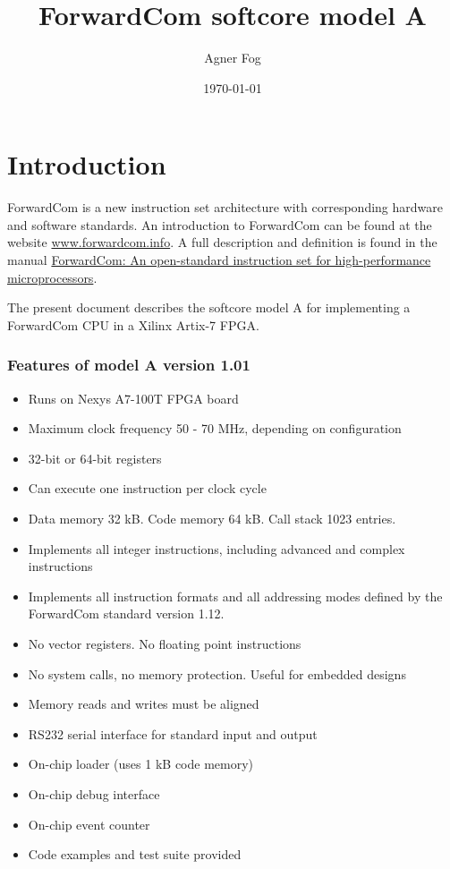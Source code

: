 \documentclass[11pt,a4paper,oneside,openright]{report}
\newcommand{\vv}{ \vspace{2mm} }   %
\begin{document}
\title{ForwardCom softcore model A}
\author{Agner Fog}
\date{\today}
\maketitle
\RaggedRight

\tableofcontents
\setcounter{secnumdepth}{1}


\chapter{Introduction}
ForwardCom is a new instruction set architecture with corresponding hardware and software standards. An introduction to ForwardCom can be found at the website \href{https://www.forwardcom.info}{www.forwardcom.info}. 
A full description and definition is found in the manual 
\href{https://github.com/ForwardCom/manual/raw/master/forwardcom.pdf}{ForwardCom: An open-standard instruction set for high-performance microprocessors}.
\vv

The present document describes the softcore model A 
for implementing a ForwardCom CPU in a Xilinx Artix-7 FPGA.
\vv

\subsection{Features of model A version 1.01}
\begin{itemize}
\item Runs on Nexys A7-100T FPGA board
\item Maximum clock frequency 50 - 70 MHz, depending on configuration
\item 32-bit or 64-bit registers
\item Can execute one instruction per clock cycle
\item Data memory 32 kB. Code memory 64 kB. Call stack 1023 entries.
\item Implements all integer instructions, including advanced and complex instructions
\item Implements all instruction formats and all addressing modes defined by the ForwardCom standard version 1.12.
\item No vector registers. No floating point instructions
\item No system calls, no memory protection. Useful for embedded designs
\item Memory reads and writes must be aligned
\item RS232 serial interface for standard input and output
\item On-chip loader (uses 1 kB code memory)
\item On-chip debug interface
\item On-chip event counter
\item Code examples and test suite provided
\end{itemize}
\vv
\end{document}

